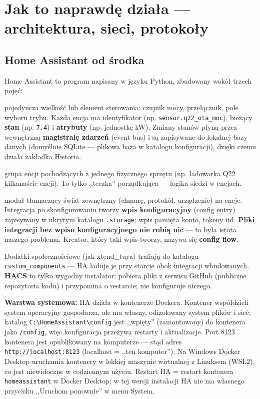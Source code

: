 \documentclass[11pt,a4paper]{article}
\begin{document}
\section{Jak to naprawdę działa --- architektura, sieci, protokoły}

\subsection{Home Assistant od środka}

Home Assistant to program napisany w języku Python, zbudowany wokół trzech pojęć:

\begin{description}[style=nextline]
\item[Encja (entity)] pojedyncza wielkość lub element sterowania: czujnik mocy, przełącznik, pole wyboru trybu. Każda encja ma identyfikator (np. \texttt{sensor.q22\_ota\_moc}), bieżący \textbf{stan} (np. \texttt{7.4}) i \textbf{atrybuty} (np. jednostkę kW). Zmiany stanów płyną przez wewnętrzną \textbf{magistralę zdarzeń} (event bus) i są zapisywane do lokalnej bazy danych (domyślnie SQLite --- plikowa baza w katalogu konfiguracji), dzięki czemu działa zakładka Historia.
\item[Urządzenie (device)] grupa encji pochodzących z jednego fizycznego sprzętu (np. ładowarka Q22 = kilkanaście encji). To tylko ,,teczka'' porządkująca --- logika siedzi w encjach.
\item[Integracja (integration)] moduł tłumaczący świat zewnętrzny (chmurę, protokół, urządzenie) na encje. Integracja po skonfigurowaniu tworzy \textbf{wpis konfiguracyjny} (config entry) zapisywany w ukrytym katalogu \texttt{.storage}; wpis pamięta konto, tokeny itd. \textbf{Pliki integracji bez wpisu konfiguracyjnego nie robią nic} --- to była istota naszego problemu. Kreator, który taki wpis tworzy, nazywa się \textbf{config flow}.
\end{description}

Dodatki społecznościowe (jak xtend\_tuya) trafiają do katalogu \texttt{custom\_components} --- HA ładuje je przy starcie obok integracji wbudowanych. \textbf{HACS} to tylko wygodny instalator: pobiera pliki z serwisu GitHub (publiczne repozytoria kodu) i przypomina o restarcie; nie konfiguruje niczego.

\textbf{Warstwa systemowa:} HA działa w kontenerze Dockera. Kontener współdzieli system operacyjny gospodarza, ale ma własny, odizolowany system plików i sieć; katalog \texttt{C:\textbackslash HomeAssistant\textbackslash config} jest ,,wpięty'' (zamontowany) do kontenera jako \texttt{/config}, więc konfiguracja przeżywa restarty i aktualizacje. Port 8123 kontenera jest opublikowany na komputerze --- stąd adres \texttt{http://localhost:8123} (localhost = ,,ten komputer''). Na Windows Docker Desktop uruchamia kontenery w lekkiej maszynie wirtualnej z Linuksem (WSL2), co jest niewidoczne w codziennym użyciu. Restart HA = restart kontenera \texttt{homeassistant} w Docker Desktop; w tej wersji instalacji HA nie ma własnego przycisku ,,Uruchom ponownie'' w menu System.
\end{document}
